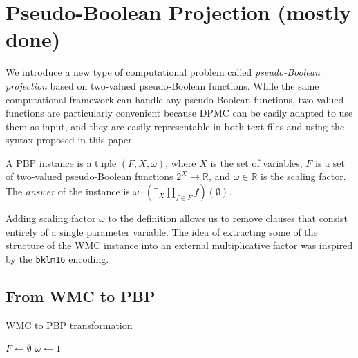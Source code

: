 \documentclass[runningheads]{llncs}
\begin{document}
\section{Pseudo-Boolean Projection (mostly done)}

We introduce a new type of computational problem called \emph{pseudo-Boolean
  projection} based on two-valued pseudo-Boolean functions. While the same
computational framework can handle any pseudo-Boolean functions, two-valued
functions are particularly convenient because \textsf{DPMC} can be easily
adapted to use them as input, and they are easily representable in both text
files and using the syntax proposed in this paper.

\begin{definition} \label{def:new_wmc}
  A PBP instance is a tuple $(F, X, \omega)$, where $X$ is the set of variables,
  $F$ is a set of two-valued pseudo-Boolean functions $2^X \to \mathbb{R}$, and
  $\omega \in \mathbb{R}$ is the scaling factor. The \emph{answer} of the
  instance is $\omega \cdot \left(\exists_X\prod_{f \in F}f\right)(\emptyset)$.
\end{definition}

Adding scaling factor $\omega$ to the definition allows us to remove clauses
that consist entirely of a single parameter variable. The idea of extracting
some of the structure of the WMC instance into an external multiplicative factor
was inspired by the \texttt{bklm16} encoding.

\subsection{From WMC to PBP}

\begin{algorithm}[t]
  \caption{WMC to PBP transformation}
  \label{alg:transformation}
  $F \gets \emptyset$\;
  $\omega \gets 1$\;
\end{algorithm}
\end{document}
